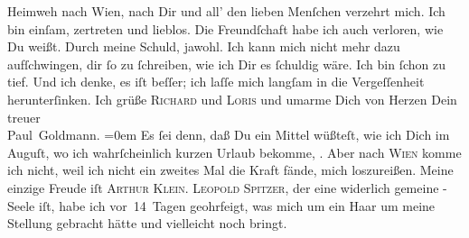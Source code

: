 \begin{ledgroupsized}[t]{13cm}
               Heimweh nach Wien, nach Dir und all’ {\pb}den lieben Menſchen verzehrt mich. Ich bin einſam,
               zertreten und lieblos. Die Freundſchaft habe ich auch verloren, wie Du weißt. Durch
               meine Schuld, jawohl. Ich kann mich nicht mehr dazu aufſchwingen, dir ſo zu
               ſchreiben, wie ich Dir es ſchuldig wäre. Ich bin ſchon zu tief. Und ich denke, es iſt
               beſſer; ich laſſe mich langſam in die Vergeſſenheit herunterſinken.\pend
           \pstart
           Ich grüße \textsc{Richard} und \textsc{Loris} und
               umarme Dich von Herzen\pend
           \pstart
           Dein {\\[\baselineskip]}treuer {\\[\baselineskip]}\spacefill\mbox{Paul Goldmann.}\pend
           \leftskip=0em{}\pstart
           \noindent{}{\pb}Es ſei denn, daß Du ein Mittel wüßteſt, wie ich
                  Dich im Auguſt, wo ich wahrſcheinlich kurzen Urlaub
                  bekomme, \label{K_L02698-4v}\label{K_L02698-4h}. Aber nach \textsc{Wien} komme ich nicht, weil ich nicht ein zweites Mal die Kraft fände, mich
                  loszureißen.\pend
           \pstart
           Meine einzige Freude iſt \textsc{Arthur Klein}. \textsc{Leopold Spitzer}, der eine widerlich gemeine \label{K_L02698-5v}\label{K_L02698-5h}-Seele iſt, habe ich
                  vor 14 Tagen geohrfeigt, was mich um ein Haar um meine Stellung gebracht hätte und
                  vielleicht noch bringt.\pend
           \endnumbering{}\end{ledgroupsized}  \newcommand{\dateiname}{L02698}\newcommand{\titel}{Paul Goldmann an Arthur Schnitzler, 24. 6. [1892]}\newcommand{\editorInnen}{Martin Anton Müller und Laura Untner}
      